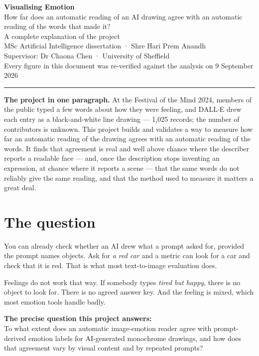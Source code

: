 \documentclass[11pt,a4paper]{article}
\newcommand{\say}[1]{\textit{\color{soft}#1}}
\begin{document}
\begin{center}
{\Huge\bfseries Visualising Emotion}\\[8pt]
{\Large How far does an automatic reading of an AI drawing agree with an automatic reading of the words that made it?}\\[14pt]
{\color{soft}\large A complete explanation of the project}\\[10pt]
{\color{soft}MSc Artificial Intelligence dissertation · Shre Hari Prem Anandh}\\
{\color{soft}Supervisor: Dr Chaona Chen · University of Sheffield}\\[4pt]
{\color{soft}\small Every figure in this document was re-verified against the analysis on 9 September 2026}
\end{center}
\vspace{6pt}\hrule\vspace{12pt}

\begin{key}
\textbf{The project in one paragraph.} At the Festival of the Mind 2024, members of the public typed a
few words about how they were feeling, and DALL$\cdot$E drew each entry as a black-and-white line
drawing --- 1{,}025 records; the number of contributors is unknown. This project builds and validates a
way to measure how far an automatic reading of the drawing agrees with an automatic reading of the
words. It finds that agreement is real and well above chance where the describer reports a readable face
--- and, once the description stops inventing an expression, at chance where it reports a scene ---
that the same words do not reliably give the same reading, and that the method used to measure it
matters a great deal.
\end{key}

\section{The question}

You can already check whether an AI drew what a prompt asked for, provided the prompt names objects.
Ask for \say{a red car} and a metric can look for a car and check that it is red. That is what most
text-to-image evaluation does.

Feelings do not work that way. If somebody types \say{tired but happy}, there is no object to look
for. There is no agreed answer key. And the feeling is mixed, which most emotion tools handle badly.

\begin{key}
\textbf{The precise question this project answers:}\\[4pt]
To what extent does an automatic image-emotion reader agree with prompt-derived emotion labels for
AI-generated monochrome drawings, and how does that agreement vary by visual content and by repeated
prompts?
\end{key}
\end{document}
